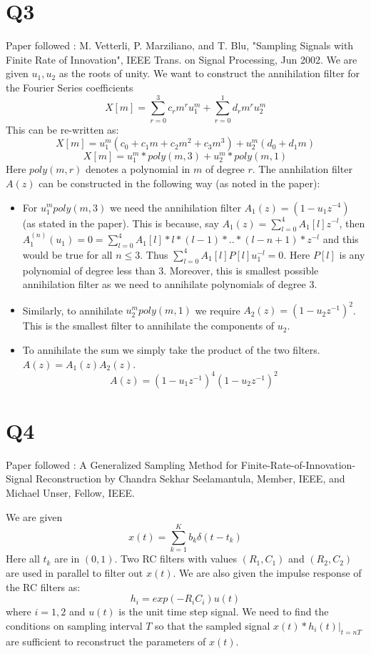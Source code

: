 \documentclass{article}
\begin{document}
\section*{Q3}
Paper followed : M. Vetterli, P. Marziliano, and T. Blu, "Sampling Signals with Finite Rate of Innovation", IEEE Trans. on Signal Processing, Jun 2002.
We are given $u_1, u_2$ as the roots of unity. We want to construct the annihilation filter for the Fourier Series coefficients $$X[m] = \sum_{r=0}^3 c_r m^r u_1^m + \sum_{r=0}^1 d_r m^r u_2^m$$
This can be re-written as:
$$X[m] = u_1^m (c_0 + c_1 m + c_2 m^2 + c_3 m^3) + u_2^m (d_0 + d_1 m)$$
$$X[m] = u_1^m * poly(m, 3) + u_2^m * poly(m, 1)$$
Here $poly(m, r)$ denotes a polynomial in $m$ of degree $r$.
The annhilation filter $A(z)$ can be constructed in the following way (as noted in the paper):
\begin{itemize}
\item For $u_1^m poly(m, 3)$ we need the annihilation filter $A_1(z) = (1 - u_1z^{-4})$ (as stated in the paper). This is because, say $A_1(z) = \sum_{l=0}^4A_1[l]z^{-l}$, then $A_1^{(n)}(u_1) = 0 = \sum_{l=0}^4A_1[l] * l * (l-1) * .. * (l - n + 1) * z^{-l}$ and this would be true for all $n \le 3$. Thus $\sum_{l=0}^4A_1[l]P[l]u_1^{-l} = 0$. Here $P[l]$ is any polynomial of degree less than $3$. Moreover, this is smallest possible annihilation filter as we need to annihilate polynomials of degree 3.
\item Similarly, to annihilate $u_2^m poly(m, 1)$ we require $A_2(z) = (1 - u_2z^{-1})^2$. This is the smallest filter to annihilate the components of $u_2$.
\item To annihilate the sum we simply take the product of the two filters. $A(z) = A_1(z) A_2(z)$.
  $$A(z) = (1 - u_1z^{-1})^4 (1 - u_2z^{-1})^2$$
\end{itemize}

\section*{Q4}
Paper followed : A Generalized Sampling Method for Finite-Rate-of-Innovation-Signal Reconstruction by Chandra Sekhar Seelamantula, Member, IEEE, and Michael Unser, Fellow, IEEE.

We are given
$$x(t) = \sum_{k=1}^K b_k \delta (t - t_k)$$
Here all $t_k$ are in $(0, 1)$. Two RC filters with values $(R_1,C_1)$ and $(R_2, C_2)$ are used in parallel to filter out $x(t)$. We are also given the impulse response of the RC filters as:
$$h_i = exp(-R_i C_i) u(t)$$
where $i = 1, 2$ and $u(t)$ is the unit time step signal. We need to find the conditions on sampling interval $T$ so that the sampled signal $x(t) * h_i(t)|_{t = nT}$ are sufficient to reconstruct the parameters of $x(t)$.
\end{document}
